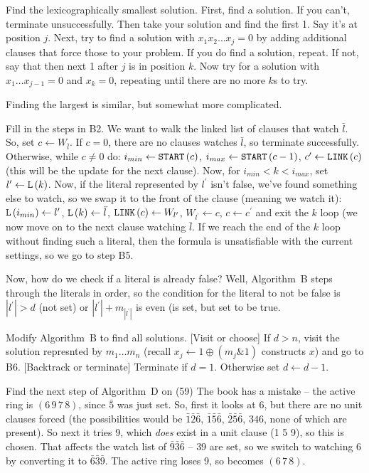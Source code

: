 \vskip 0.08in  Find the lexicographically smallest
solution.\hfil\break
First, find a solution.  If you can't, terminate unsuccessfully.  Then take your
solution and find the first 1.  Say it's at position $j$.  Next, try to find a solution
with $x_1 x_2 \ldots x_j = 0$ by adding additional clauses that force those
to your problem.  If you do find a solution, repeat.  If not, say that then next
1 after $j$ is in position $k$.  Now try for a solution with $x_1 \ldots x_{j-1} = 0$
and $x_k = 0$, repeating until there are no more $k$s to try.

Finding the largest is similar, but somewhat more complicated.

 Fill in the steps in B2.\hfil\break
We want to walk the linked list of clauses that watch $\bar l$.  So, set
$c \gets W_{\bar l}$.  If $c = 0$, there are no clauses watches $\bar l$, so
terminate successfully.  Otherwise, while $c \ne 0$ do: $i_{min} \gets {\tt START}
\left(c\right)$, $i_{max} \gets {\tt START}\left(c - 1\right)$, $c^{\prime} \gets 
{\tt LINK}\left(c\right)$ (this will be the update for the next clause).
Now, for $i_{min} < k < i_{max}$, set $l^{\prime} \gets {\tt L}\left(k\right)$.
Now, if the literal represented by $l^{\prime}$ isn't false, we've found
something else to watch, so we swap it to the front of the clause (meaning we
watch it): ${\tt L}\left(i_{min}\right) \gets l^{\prime}$, ${\tt L}\left(k\right) \gets \bar l$,
${\tt LINK}\left(c\right) \gets W_{l^{\prime}}$, $W_{l^{\prime}} \gets c$, $c \gets c^{\prime}$
and exit the $k$ loop (we now move on to the next clause watching $\bar l$.
If we reach the end of the $k$ loop without finding such a literal, then the formula
is unsatisfiable with the current settings, so we go to step B5.

Now, how do we check if a literal is already false?  Well, Algorithm~B steps
through the literals in order, so the condition for the literal to not be false is
$| l^{\prime} | > d$ (not set) or $| l^{\prime} | + m_{| l^{\prime} |}$ is even (is set,
but set to be true.

 Modify Algorithm~B to find all solutions.
  [Visit or choose] If $d > n$, visit the solution represnted by $m_1 \ldots m_n$
(recall $x_j \gets 1 \oplus \left( m_j \& 1 \right)$ constructs $x$) and go to B6.
 [Backtrack or terminate] Terminate if $d=1$.  Otherwise set $d \gets d - 1$.

 Find the next step of Algorithm~D on (59)\hfil\break
The book has a mistake -- the active ring is $\left(6\,9\,7\,8\right)$, since 
$\bar 5$ was just set.  So, first it looks at 6, but there are no unit clauses forced
(the possibilities would be $\bar 1 \bar 2 \bar 6$, $\bar 1 \bar 5 \bar 6$, $\bar 2 \bar 5 \bar 6$,
$346$, none of which are present). So next it tries 9, which {\it does} exist in a unit 
clause (1 5 9), so this is chosen.  That affects the watch list of $\bar 9 \bar 3 \bar 6$ --
$39$ are set, so we switch to watching 6 by converting it to $\bar 6 \bar 3 \bar 9$.
The active ring loses 9, so becomes $\left(6\,7\,8\right)$.

